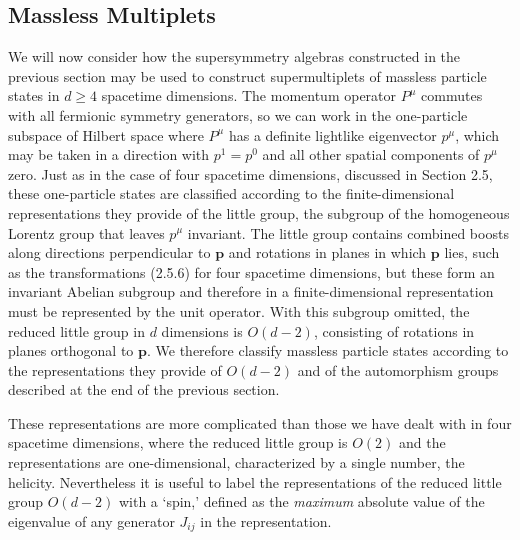 
\subsection{Massless Multiplets}

We will now consider how the supersymmetry algebras constructed in the
previous section may be used to construct supermultiplets of massless
particle states in \(d\geq4\) spacetime dimensions. The momentum operator
\(P^\mu\) commutes with all fermionic symmetry generators, so we can work
in the one-particle subspace of Hilbert space where \(P^\mu\) has a definite
lightlike eigenvector \(p^\mu\), which may be taken in a direction with
\(p^1=p^0\) and all other spatial components of \(p^\mu\) zero. Just as in
the case of four spacetime dimensions, discussed in Section 2.5, these
one-particle states are classified according to the finite-dimensional
representations they provide of the little group, the subgroup of the
homogeneous Lorentz group that leaves \(p^\mu\) invariant. The little group
contains combined boosts along directions perpendicular to \(\mathbf p\)
and rotations in planes in which \(\mathbf p\) lies, such as the
transformations (2.5.6) for four spacetime dimensions, but these form an
invariant Abelian subgroup and therefore in a finite-dimensional
representation must be represented by the unit operator. With this
subgroup omitted, the reduced little group in \(d\) dimensions is
\(O(d-2)\), consisting of rotations in planes orthogonal to \(\mathbf p\).
We therefore classify massless particle states according to the
representations they provide of \(O(d-2)\) and of the automorphism groups
described at the end of the previous section.

These representations are more complicated than those we have dealt with
in four spacetime dimensions, where the reduced little group is \(O(2)\)
and the representations are one-dimensional, characterized by a single
number, the helicity. Nevertheless it is useful to label the
representations of the reduced little group \(O(d-2)\) with a `spin,'
defined as the \emph{maximum} absolute value of the eigenvalue of any
generator \(J_{ij}\) in the representation.

